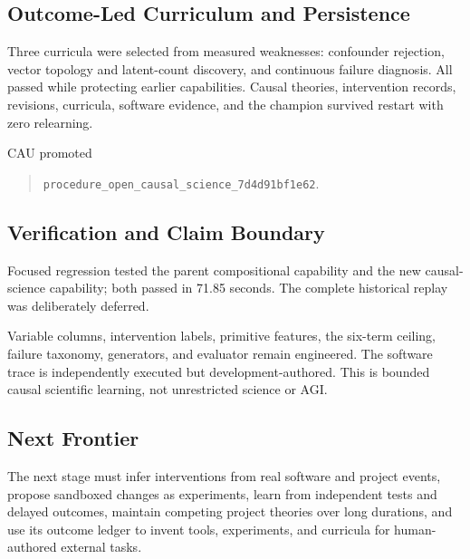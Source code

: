 \subsection{Outcome-Led Curriculum and Persistence}

Three curricula were selected from measured weaknesses: confounder rejection,
vector topology and latent-count discovery, and continuous failure diagnosis.
All passed while protecting earlier capabilities. Causal theories,
intervention records, revisions, curricula, software evidence, and the champion
survived restart with zero relearning.

CAU promoted
\begin{quote}
\texttt{procedure\_open\_causal\_science\_7d4d91bf1e62}.
\end{quote}

\subsection{Verification and Claim Boundary}

Focused regression tested the parent compositional capability and the new
causal-science capability; both passed in 71.85 seconds. The complete historical
replay was deliberately deferred.

Variable columns, intervention labels, primitive features, the six-term ceiling,
failure taxonomy, generators, and evaluator remain engineered. The software
trace is independently executed but development-authored. This is bounded
causal scientific learning, not unrestricted science or AGI.

\subsection{Next Frontier}

The next stage must infer interventions from real software and project events,
propose sandboxed changes as experiments, learn from independent tests and
delayed outcomes, maintain competing project theories over long durations, and
use its outcome ledger to invent tools, experiments, and curricula for
human-authored external tasks.

